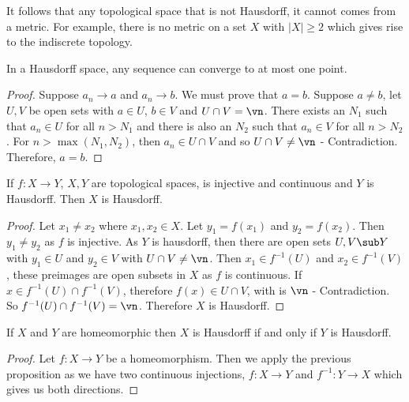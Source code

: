 \begin{remark}
   It follows that any topological space that is not Hausdorff, it cannot comes from a metric. For example, there is no metric on a set $X$ with $|X| \ge 2$ which gives rise to the indiscrete topology.
\end{remark}

\begin{nprop}
  In a Hausdorff space, any sequence can converge to at most one point.
\end{nprop}
\begin{proof}
  Suppose $a_n \to a$ and $a_n \to b$. We must prove that $a = b$. Suppose $a \ne b$, let $U, V$ be open sets with $a \in U$, $b \in V$ and $U \cap V = \vn$. There exists an $N_1$ such that $a_n \in U$ for all $n > N_1$ and there is also an $N_2$ such that $a_n \in V$ for all $n > N_2$. For $n > \max(N_1, N_2)$, then $a_n \in U\cap V$ and so $U \cap V \ne \vn$ - Contradiction. Therefore, $a = b$.
\end{proof}

\begin{nprop}
   If $f : X \to Y$, $X, Y$ are topological spaces, is injective and continuous and $Y$ is Hausdorff. Then $X$ is Hausdorff.
\end{nprop}
\begin{proof}
  Let $x_1 \ne x_2$ where $x_1, x_2 \in X$. Let $y_1 = f(x_1)$ and $y_2 = f(x_2)$. Then $y_1 \ne y_2$ as $f$ is injective. As $Y$ is hausdorff, then there are open sets $U, V \sub Y$ with $y_1 \in U$ and $y_2 \in V$ with $U \cap V \ne \vn$. Then $x_1 \in f^{-1}(U)$ and $x_2 \in f^{-1}(V)$, these preimages are open subsets in $X$ as $f$ is continuous.
  If $x \in f^{-1}(U) \cap f^{-1}(V)$, therefore $f(x) \in U \cap V$, with is $\vn$ - Contradiction. So $f^{-1}(U) \cap f^{-1}(V) = \vn$. Therefore $X$ is Hausdorff.
\end{proof}

\begin{ncor}
   If $X$ and $Y$ are homeomorphic then $X$ is Hausdorff if and only if $Y$ is Hausdorff.
\end{ncor}
\begin{proof}
  Let $f : X \to Y$ be a homeomorphism. Then we apply the previous proposition as we have two continuous injections, $f : X \to Y$ and $f^{-1} : Y \to X$ which gives us both directions.
\end{proof}